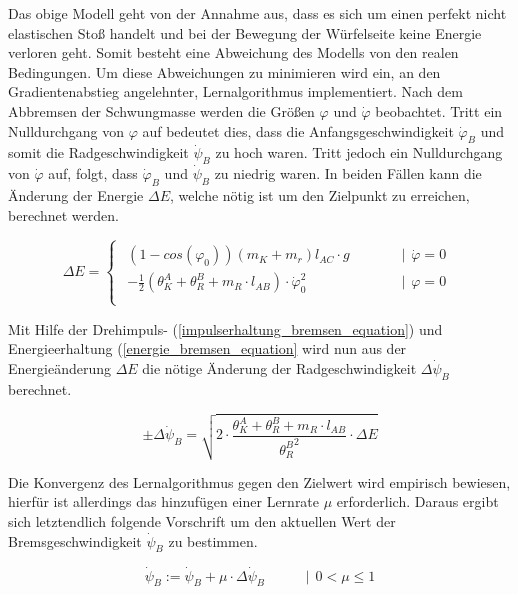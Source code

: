 Das obige Modell geht von der Annahme aus, dass es sich um einen perfekt nicht elastischen Stoß handelt und bei der Bewegung der Würfelseite keine Energie verloren geht. Somit besteht eine Abweichung des Modells von den realen Bedingungen. Um diese Abweichungen zu minimieren wird ein, an den Gradientenabstieg angelehnter, Lernalgorithmus implementiert. Nach dem Abbremsen der Schwungmasse werden die Größen $\varphi$ und $\dot{\varphi}$ beobachtet. Tritt ein Nulldurchgang von $\varphi$ auf bedeutet dies, dass die Anfangsgeschwindigkeit $\dot{\varphi}_B$ und somit die Radgeschwindigkeit $\dot{\psi}_B$ zu hoch waren. Tritt jedoch ein Nulldurchgang von $\dot{\varphi}$ auf, folgt, dass $\dot{\varphi}_B$ und $\dot{\psi}_B$ zu niedrig waren. In beiden Fällen kann die Änderung der Energie $\Delta E$, welche nötig ist um den Zielpunkt zu erreichen, berechnet werden.

\begin{equation}
\Delta E = \begin{cases}
\begin{matrix}
(1-cos(\varphi_0))(m_K+m_r)l_{AC} \cdot g  & \hspace{35pt} \vert \hspace{5pt} \dot{\varphi} = 0 \\
-\frac{1}{2}(\theta^A_K + \theta^B_R + m_R \cdot l_{AB}) \cdot \dot{\varphi}^2_0 & \hspace{35pt} \vert \hspace{5pt} {\varphi} = 0 \\
\end{matrix}

\end{cases}
\end{equation}

Mit Hilfe der Drehimpuls- (\ref{impulserhaltung_bremsen_equation}) und Energieerhaltung (\ref{energie_bremsen_equation} wird nun aus der Energieänderung $\Delta E$ die nötige Änderung der Radgeschwindigkeit $\Delta \dot{\psi}_B$ berechnet.

\begin{equation}
\pm \Delta \dot{\psi}_B = \sqrt{2 \cdot \frac{\theta^A_K + \theta^B_R + m_R \cdot l_{AB}}{{\theta^B_R}^2} \cdot \Delta E}
\end{equation}

Die Konvergenz des Lernalgorithmus gegen den Zielwert wird empirisch bewiesen, hierfür ist allerdings das hinzufügen einer Lernrate $\mu$ erforderlich. Daraus ergibt sich letztendlich folgende Vorschrift um den aktuellen Wert der Bremsgeschwindigkeit $\dot{\psi}_B$ zu bestimmen.

\begin{equation}
\dot{\psi}_B := \dot{\psi}_B + \mu \cdot \Delta \dot{\psi}_B \hspace{35pt} \vert \hspace{5pt} 0 < \mu \le 1
\end{equation}